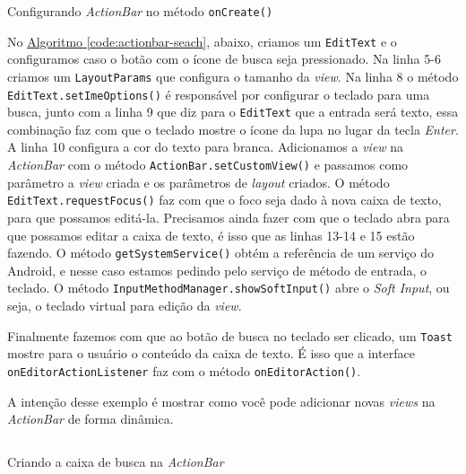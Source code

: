 \documentclass[a4paper,12pt,brazil,oneside]{book}
\begin{document}
\begin{singlespace}
		\begin{listing}[H]
		\inputminted[linenos=true,fontsize=\small,frame=lines, framesep=2mm, tabsize=2,numbersep=5pt]{java}{src/design/actionbar-oncreate.java}
		\caption{Configurando \emph{ActionBar} no método \texttt{onCreate()}}
		\end{listing}
		
		No \hyperref[code:actionbar-seach]{Algoritmo \ref*{code:actionbar-seach}}, abaixo, criamos um \texttt{EditText} e o configuramos caso o botão com o ícone de busca seja pressionado. Na linha 5-6 criamos um \texttt{LayoutParams} que configura o tamanho da \emph{view}. Na linha 8 o método \texttt{EditText.setImeOptions()} é responsável por configurar o teclado para uma busca, junto com a linha 9 que diz para o \texttt{EditText} que a entrada será texto, essa combinação faz com que o teclado mostre o ícone da lupa no lugar da tecla \emph{Enter}. A linha 10 configura a cor do texto para branca. Adicionamos a \emph{view} na \emph{ActionBar} com o método \texttt{ActionBar.setCustomView()} e passamos como parâmetro a \emph{view} criada e os parâmetros de \emph{layout} criados. O método \texttt{EditText.requestFocus()} faz com que o foco seja dado à nova caixa de texto, para que possamos editá-la. Precisamos ainda fazer com que o teclado abra para que possamos editar a caixa de texto, é isso que as linhas 13-14 e 15 estão fazendo. O método \texttt{getSystemService()} obtém a referência de um serviço do Android, e nesse caso estamos pedindo pelo serviço de método de entrada, o teclado. O método \texttt{InputMethodManager.showSoftInput()} abre o \emph{Soft Input}, ou seja, o teclado virtual para edição da \emph{view}. 
		
		Finalmente fazemos com que ao botão de busca no teclado ser clicado, um \texttt{Toast} mostre para o usuário o conteúdo da caixa de texto. É isso que a interface \texttt{onEditorActionListener} faz com o método \texttt{onEditorAction()}.
		
		A intenção desse exemplo é mostrar como você pode adicionar novas \emph{views} na \emph{ActionBar} de forma dinâmica.
		 
		\begin{listing}[H]
		\inputminted[linenos=true,fontsize=\small,frame=lines, framesep=2mm, tabsize=2,numbersep=5pt]{java}{src/design/actionbar-acao.java}
		\caption{Criando a caixa de busca na \emph{ActionBar}}
		\label{code:actionbar-seach}
		\end{listing}
		

\end{singlespace}
\end{document}
